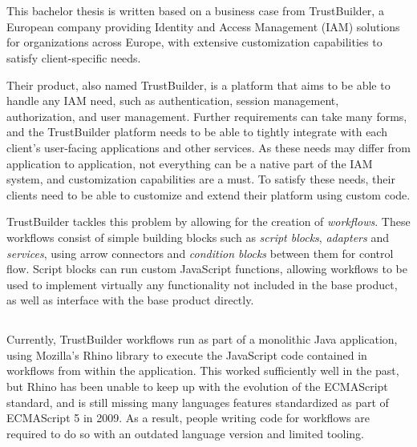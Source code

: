 
\chapter{}%
\label{ch:inleiding}

This bachelor thesis is written based on a business case from TrustBuilder, a European company providing Identity and Access Management (IAM) solutions for organizations across Europe, with extensive customization capabilities to satisfy client-specific needs.

Their product, also named TrustBuilder, is a platform that aims to be able to handle any IAM need, such as authentication, session management, authorization, and user management. Further requirements can take many forms, and the TrustBuilder platform needs to be able to tightly integrate with each client’s user-facing applications and other services. As these needs may differ from application to application, not everything can be a native part of the IAM system, and customization capabilities are a must. To satisfy these needs, their clients need to be able to customize and extend their platform using custom code.

TrustBuilder tackles this problem by allowing for the creation of \emph{workflows}. These workflows consist of simple building blocks such as \emph{script blocks}, \emph{adapters} and \emph{services}, using arrow connectors and \emph{condition blocks} between them for control flow. Script blocks can run custom JavaScript functions, allowing workflows to be used to implement virtually any functionality not included in the base product, as well as interface with the base product directly.

\section{}%
\label{sec:probleemstelling}

Currently, TrustBuilder workflows run as part of a monolithic Java application, using Mozilla's Rhino library to execute the JavaScript code contained in workflows from within the application. This worked sufficiently well in the past, but Rhino has been unable to keep up with the evolution of the ECMAScript standard, and is still missing many languages features standardized as part of ECMAScript 5 in 2009. As a result, people writing code for workflows are required to do so with an outdated language version and limited tooling.

